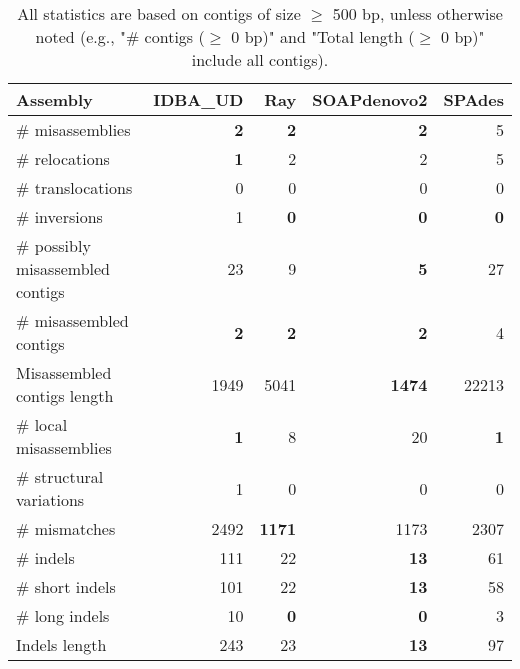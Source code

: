 \documentclass[12pt,a4paper]{article}
\begin{document}
\begin{table}[ht]
\begin{center}
\caption{All statistics are based on contigs of size $\geq$ 500 bp, unless otherwise noted (e.g., "\# contigs ($\geq$ 0 bp)" and "Total length ($\geq$ 0 bp)" include all contigs).}
\begin{tabular}{|l*{4}{|r}|}
\hline
Assembly & IDBA\_UD & Ray & SOAPdenovo2 & SPAdes \\ \hline
\# misassemblies & {\bf 2} & {\bf 2} & {\bf 2} & 5 \\ \hline
\hspace{5mm}\# relocations & {\bf 1} & 2 & 2 & 5 \\ \hline
\hspace{5mm}\# translocations & 0 & 0 & 0 & 0 \\ \hline
\hspace{5mm}\# inversions & 1 & {\bf 0} & {\bf 0} & {\bf 0} \\ \hline
\# possibly misassembled contigs & 23 & 9 & {\bf 5} & 27 \\ \hline
\# misassembled contigs & {\bf 2} & {\bf 2} & {\bf 2} & 4 \\ \hline
Misassembled contigs length & 1949 & 5041 & {\bf 1474} & 22213 \\ \hline
\# local misassemblies & {\bf 1} & 8 & 20 & {\bf 1} \\ \hline
\# structural variations & 1 & 0 & 0 & 0 \\ \hline
\# mismatches & 2492 & {\bf 1171} & 1173 & 2307 \\ \hline
\# indels & 111 & 22 & {\bf 13} & 61 \\ \hline
\hspace{5mm}\# short indels & 101 & 22 & {\bf 13} & 58 \\ \hline
\hspace{5mm}\# long indels & 10 & {\bf 0} & {\bf 0} & 3 \\ \hline
Indels length & 243 & 23 & {\bf 13} & 97 \\ \hline
\end{tabular}
\end{center}
\end{table}
\end{document}
